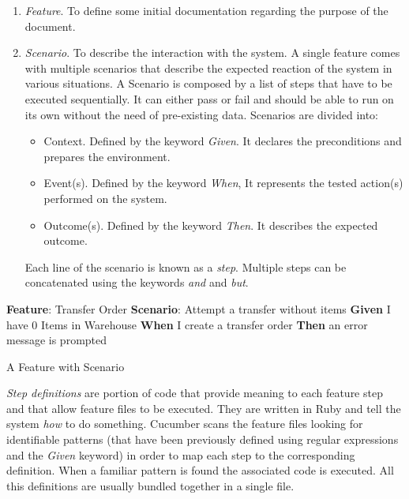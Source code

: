 \begin{enumerate}
  \item \textit{Feature}. To define some initial documentation regarding the purpose of the document.
  \item \textit{Scenario}. To describe the interaction with the system. A single feature comes with multiple scenarios that describe the expected reaction of the system in various situations. A Scenario is composed by a list of steps that have to be executed sequentially. It can either pass or fail and should be able to run on its own without the need of pre-existing data. Scenarios are divided into:
  \begin{itemize}
    \item Context. Defined by the keyword \textit{Given}. It declares the preconditions and prepares the environment.
    \item Event(s). Defined by the keyword \textit{When}, It represents the tested action(s) performed on the system.
    \item Outcome(s). Defined by the keyword \textit{Then}. It describes the expected outcome.
  \end{itemize}
  
  Each line of the scenario is known as a \textit{step}. Multiple steps can be concatenated using the keywords \textit{and} and \textit{but}.
\end{enumerate}

\begin{algorithm}[H]
\SetAlgoLined
\textbf{Feature}: Transfer Order\;
    \hspace{5mm} \textbf{Scenario}: Attempt a transfer without items\;
        \hspace{10mm} \textbf{Given} I have 0 Items in Warehouse\;
        \hspace{10mm} \textbf{When} I create a transfer order\;
        \hspace{10mm} \textbf{Then} an error message is prompted\;
\caption{A Feature with Scenario}
\label{alg:featureWithScenario}
\end{algorithm}


\textit{Step definitions} are portion of code that provide meaning to each feature step and that allow feature files to be executed. They are written in Ruby and tell the system \textit{how} to do something. Cucumber scans the feature files looking for identifiable patterns (that have been previously defined using regular expressions and the \textit{Given} keyword) in order to map each step to the corresponding definition. When a familiar pattern is found the associated code is executed. All this definitions are usually bundled together in a single file.
